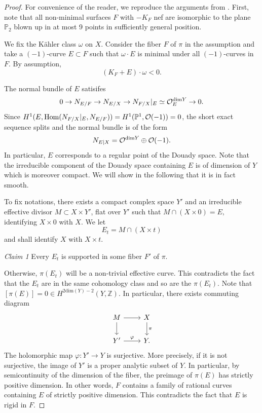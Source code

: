 \documentclass[a4, 12pt]{amsart}
\numberwithin{equation}{section}
\theoremstyle{definition}
\def\Z{\mathbb{Z}}
\def\P{\mathbb{P}}
\def\P{\mathbb{P}}
\def \dim{\mathrm{dim}}
\begin{document}
\begin{proof} For convenience of the reader, we reproduce the arguments from \cite[Proposition 0.4]{PS98}.
First, note that all non-minimal surfaces $F$ with $-K_F$ nef are isomorphic to the
plane $\P_2$ blown up in at most 9 points in sufficiently general position.

We fix the K\"ahler class $\omega$ on $X$. Consider the fiber $F$ of $\pi$ in the assumption and
take a $(-1)$-curve $E \subset F$ such that $\omega \cdot E$ is minimal under all $(-1)$-curves in $F.$
By assumption,
$$(K_F+E) \cdot \omega <0.$$

The normal bundle of $E$ satisifes
$$0 \to N_{E/F} \to N_{E/X} \to N_{F/X}|_E \simeq \cO_E^{\dim Y} \to 0.$$
Since $H^1(E, \mathrm{Hom}(N_{F/X}|_E,  N_{E/F}))=H^1(\P^1, \cO(-1))=0$, the short exact sequence splits and the normal bundle
is of the form
$$ N_{E \vert X} = \cO^{\dim Y} \oplus \cO(-1).$$
In particular, $E$ corresponds to a regular point of the Douady space. 
Note that the irreducible component of the Douady space containing $E$ is of dimension of $Y$ which is moreover compact.
We will show in the following that it is in fact smooth.

To fix notations,
there exists a compact complex space $Y'$ and an irreducible effective divisor
$M \subset X \times Y'$, flat over $Y'$ such that $M \cap (X \times 0) = E,$ identifying  $X \times 0$ with $X.$
We let
$$ E_t = M \cap (X \times t)$$
and shall identify $X$ with $X \times t.$

{\it Claim 1} Every $E_t$ is supported in some fiber $F'$ of $\pi.$

Otherwise, $\pi(E_t)$ will be a non-trivial effective curve.
This contradicts the fact that the $E_t$ are in the same cohomology class and so are the $\pi(E_t)$.
Note that $[\pi(E)]=0 \in H^{2 \dim (Y)-2}(Y, \Z)$.
In particular, there exists commuting diagram
$$\begin{tikzcd}
M \arrow[r] \arrow[d] & X \arrow[d, "\pi"] \\
Y' \arrow[r, "\varphi"]          & Y.
\end{tikzcd}$$
The holomorphic map $\varphi: Y' \to Y$ is surjective.
More precisely,  if it is not surjective, the image of $Y'$ is a proper analytic subset of $Y$.
In particular, by semicontinuity of the dimension of the fiber, the preimage of $\pi(E)$ has strictly positive dimension.
In other words, $F$ contains a family of rational curves containing $E$ of strictly positive dimension.
This contradicts the fact that $E$ is rigid in $F$.


\end{proof}
\end{document}
